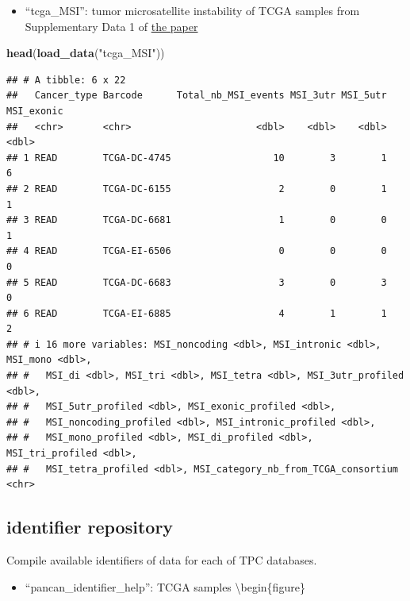 \documentclass[
]{book}
\newenvironment{Shaded}{\begin{snugshade}}{\end{snugshade}}
\newcommand{\FunctionTok}[1]{\textcolor[rgb]{0.13,0.29,0.53}{\textbf{#1}}}
\newcommand{\NormalTok}[1]{#1}
\newcommand{\StringTok}[1]{\textcolor[rgb]{0.31,0.60,0.02}{#1}}
\providecommand{\tightlist}{%
  \setlength{\itemsep}{0pt}\setlength{\parskip}{0pt}}
\begin{document}
\begin{itemize}
\tightlist
\item
  ``tcga\_MSI'': tumor microsatellite instability of TCGA samples from Supplementary Data 1 of \href{https://www.nature.com/articles/ncomms15180\#Sec22}{the paper}
\end{itemize}

\begin{Shaded}
\begin{Highlighting}[]
\FunctionTok{head}\NormalTok{(}\FunctionTok{load\_data}\NormalTok{(}\StringTok{"tcga\_MSI"}\NormalTok{))}
\end{Highlighting}
\end{Shaded}

\begin{verbatim}
## # A tibble: 6 x 22
##   Cancer_type Barcode      Total_nb_MSI_events MSI_3utr MSI_5utr MSI_exonic
##   <chr>       <chr>                      <dbl>    <dbl>    <dbl>      <dbl>
## 1 READ        TCGA-DC-4745                  10        3        1          6
## 2 READ        TCGA-DC-6155                   2        0        1          1
## 3 READ        TCGA-DC-6681                   1        0        0          1
## 4 READ        TCGA-EI-6506                   0        0        0          0
## 5 READ        TCGA-DC-6683                   3        0        3          0
## 6 READ        TCGA-EI-6885                   4        1        1          2
## # i 16 more variables: MSI_noncoding <dbl>, MSI_intronic <dbl>, MSI_mono <dbl>,
## #   MSI_di <dbl>, MSI_tri <dbl>, MSI_tetra <dbl>, MSI_3utr_profiled <dbl>,
## #   MSI_5utr_profiled <dbl>, MSI_exonic_profiled <dbl>,
## #   MSI_noncoding_profiled <dbl>, MSI_intronic_profiled <dbl>,
## #   MSI_mono_profiled <dbl>, MSI_di_profiled <dbl>, MSI_tri_profiled <dbl>,
## #   MSI_tetra_profiled <dbl>, MSI_category_nb_from_TCGA_consortium <chr>
\end{verbatim}

\subsection{identifier repository}\label{identifier-repository}

Compile available identifiers of data for each of TPC databases.

\begin{itemize}
\tightlist
\item
  ``pancan\_identifier\_help'': TCGA samples
  \textbackslash begin\{figure\}
\end{itemize}
\end{document}
